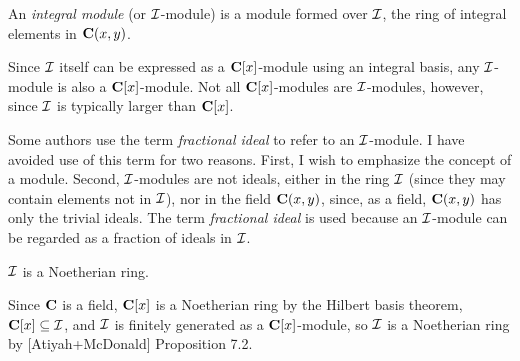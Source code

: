 
\setcounter{chapter}{8}



\vfill\eject
{}





An {\it integral module} (or ${\cal I}$-module) is a module formed
over ${\cal I}$, the ring of integral elements in ${\bf C}(x,y)$.

\enddefinition

Since ${\cal I}$ itself can be expressed as a ${\bf C}[x]$-module
using an integral basis, any ${\cal I}$-module is also a ${\bf
C}[x]$-module.  Not all ${\bf C}[x]$-modules are ${\cal I}$-modules,
however, since ${\cal I}$ is typically larger than ${\bf C}[x]$.

Some authors use the term {\it fractional ideal} to refer to an ${\cal
I}$-module.  I have avoided use of this term for two reasons.  First,
I wish to emphasize the concept of a module.  Second, ${\cal
I}$-modules are not ideals, either in the ring ${\cal I}$ (since they
may contain elements not in ${\cal I}$), nor in the field ${\bf
C}(x,y)$, since, as a field, ${\bf C}(x,y)$ has only the trivial
ideals.  The term {\it fractional ideal} is used because an ${\cal
I}$-module can be regarded as a fraction of ideals in ${\cal I}$.

\theorem ${\cal I}$ is a Noetherian ring.
\label{I is Noetherian}

\proof

Since ${\bf C}$ is a field, ${\bf C}[x]$ is a Noetherian ring by the
Hilbert basis theorem, ${\bf C}[x] \subseteq {\cal I}$, and ${\cal I}$ is
finitely generated as a ${\bf C}[x]$-module, so ${\cal I}$ is a
Noetherian ring by [Atiyah+McDonald] Proposition 7.2.

